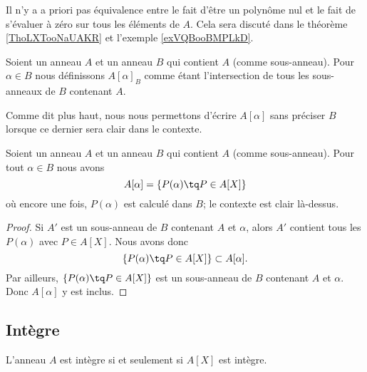 Il n'y a a priori pas équivalence entre le fait d'être un polynôme nul et le fait de s'évaluer à zéro sur tous les éléments de \( A\). Cela sera discuté dans le théorème \ref{ThoLXTooNaUAKR} et l'exemple \ref{exVQBooBMPLkD}.

\begin{definition}
    Soient un anneau \( A\) et un anneau \( B\) qui contient \( A\) (comme sous-anneau). Pour \( \alpha\in B\) nous définissons \( A[\alpha]_B\) comme étant l'intersection de tous les sous-anneaux de \( B\) contenant \( A\).
\end{definition}
Comme dit plus haut, nous nous permettons d'écrire \( A[\alpha]\) sans préciser \( B\) lorsque ce dernier sera clair dans le contexte.

\begin{proposition}     \label{PROPooPMNSooOkHOxJ}
    Soient un anneau \( A\) et un anneau \( B\) qui contient \( A\) (comme sous-anneau). Pour tout \( \alpha\in B\) nous avons
    \begin{equation}
        A[\alpha]=\{ P(\alpha)\tq P\in A[X] \}
    \end{equation}
    où encore une fois, \( P(\alpha)\) est calculé dans \( B\); le contexte est clair là-dessus.
\end{proposition}

\begin{proof}
    Si \( A'\) est un sous-anneau de \( B\) contenant \( A\) et \( \alpha\), alors \( A'\) contient tous les \( P(\alpha)\) avec \( P\in A[X]\). Nous avons donc
    \begin{equation}
        \{ P(\alpha)\tq P\in A[X] \}\subset A[\alpha].
    \end{equation}
    Par ailleurs, \( \{ P(\alpha)\tq P\in A[X] \}\) est un sous-anneau de \( B\) contenant \( A\) et \( \alpha\). Donc \( A[\alpha]\) y est inclus.
\end{proof}

\subsection{Intègre}

\begin{theorem}     \label{ThoBUEDrJ}
    L'anneau \( A\) est intègre si et seulement si \( A[X]\) est intègre.
\end{theorem}

